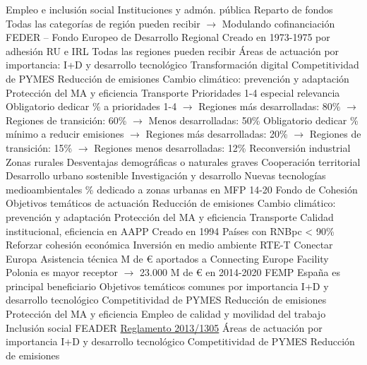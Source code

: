 \documentclass{nuevotema}
\begin{document}
\begin{esquemal}
				\4 Empleo e inclusión social
				\4 Instituciones y admón. pública
			\3 Reparto de fondos
				\4[] Todas las categorías de región pueden recibir
				\4[] $\to$ Modulando cofinanciación
				\4 FEDER --  Fondo Europeo de Desarrollo Regional
				\4[] Creado en 1973-1975 por adhesión RU e IRL
				\4[] Todas las regiones pueden recibir
				\4[] Áreas de actuación por importancia:
				\4[1] I+D y desarrollo tecnológico
				\4[2] Transformación digital
				\4[3] Competitividad de PYMES
				\4[4] Reducción de emisiones
				\4[5] Cambio climático: prevención y adaptación
				\4[6] Protección del MA y eficiencia
				\4[7] Transporte
				\4[] Prioridades 1-4 especial relevancia
				\4[] Obligatorio dedicar \% a prioridades 1-4
				\4[] $\to$ Regiones más desarrolladas: 80\%
				\4[] $\to$ Regiones de transición: 60\%
				\4[] $\to$ Menos desarrolladas: 50\%
				\4[] Obligatorio dedicar \% mínimo a reducir emisiones
				\4[] $\to$ Regiones más desarrolladas: 20\%
				\4[] $\to$ Regiones de transición: 15\%
				\4[] $\to$ Regiones menos desarrolladas: 12\%
				\4[] Reconversión industrial
				\4[] Zonas rurales
				\4[] Desventajas demográficas o naturales graves
				\4[] Cooperación territorial
				\4[] Desarrollo urbano sostenible
				\4[] Investigación y desarrollo
				\4[] Nuevas tecnologías medioambientales
				\% dedicado a zonas urbanas en MFP 14-20
				\4 Fondo de Cohesión
				\4[] Objetivos temáticos de actuación
				\4[4] Reducción de emisiones
				\4[5] Cambio climático: prevención y adaptación
				\4[6] Protección del MA y eficiencia
				\4[7] Transporte
				\4[11] Calidad institucional, eficiencia en AAPP
				\4[] Creado en 1994
				\4[] Países con RNBpc < 90\%
				\4[] Reforzar cohesión económica
				\4[] Inversión en medio ambiente
				\4[] RTE-T
				\4[] Conectar Europa
				\4[] Asistencia técnica
				 M de € aportados a Connecting Europe Facility
				\4[] Polonia es mayor receptor
				\4[] $\to$ 23.000 M de € en 2014-2020
				\4 FEMP
				\4[] España es principal beneficiario
				\4[] Objetivos temáticos comunes por importancia
				\4[1] I+D y desarrollo tecnológico
				\4[3] Competitividad de PYMES
				\4[4] Reducción de emisiones
				\4[6] Protección del MA y eficiencia
				\4[8] Empleo de calidad y movilidad del trabajo
				\4[9] Inclusión social
				\4 FEADER
				\4[] \href{https://eur-lex.europa.eu/legal-content/EN/TXT/HTML/?uri=CELEX:32013R1305&from=en}{Reglamento 2013/1305}
				\4[] Áreas de actuación por importancia
				\4[1] I+D y desarrollo tecnológico
				\4[3] Competitividad de PYMES
				\4[4] Reducción de emisiones

\end{esquemal}
\end{document}
